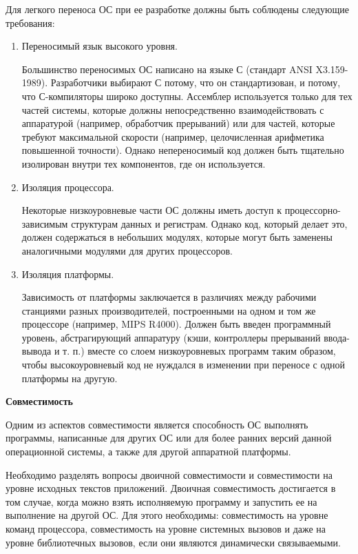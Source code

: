 Для легкого переноса ОС при ее разработке должны быть соблюдены следующие требования:
\begin{enumerate}
   \item Переносимый язык высокого уровня.

         Большинство переносимых ОС написано на языке С (стандарт ANSI X3.159-1989). Разработчики выбирают С потому, что он стандартизован, и потому, что С-компиляторы широко доступны. Ассемблер используется только для тех частей системы, которые должны непосредственно взаимодействовать с аппаратурой (например, обработчик прерываний) или для частей, которые требуют максимальной скорости (например, целочисленная арифметика повышенной точности). Однако непереносимый код должен быть тщательно изолирован внутри тех компонентов, где он используется.
   \item Изоляция процессора.

         Некоторые низкоуровневые части ОС должны иметь доступ к процессорно-зависимым структурам данных и регистрам. Однако код, который делает это, должен содержаться в небольших модулях, которые могут быть заменены аналогичными модулями для других процессоров.
   \item Изоляция платформы.

         Зависимость от платформы заключается в различиях между рабочими станциями разных производителей, построенными на одном и том же процессоре (например, MIPS R4000). Должен быть введен программный уровень, абстрагирующий аппаратуру (кэши, контроллеры прерываний ввода-вывода и т. п.) вместе со слоем низкоуровневых программ таким образом, чтобы высокоуровневый код не нуждался в изменении при переносе с одной платформы на другую.
\end{enumerate}


\hypertarget{opr3_REQ}{\textbf{Совместимость}}


Одним из аспектов совместимости является способность ОС выполнять программы, написанные для других ОС или для более ранних версий данной операционной системы, а также для другой аппаратной платформы.

Необходимо разделять вопросы двоичной совместимости и совместимости на уровне исходных текстов приложений. Двоичная совместимость достигается в том случае, когда можно взять исполняемую программу и запустить ее на выполнение на другой ОС. Для этого необходимы: совместимость на уровне команд процессора, совместимость на уровне системных вызовов и даже на уровне библиотечных вызовов, если они являются динамически связываемыми.


